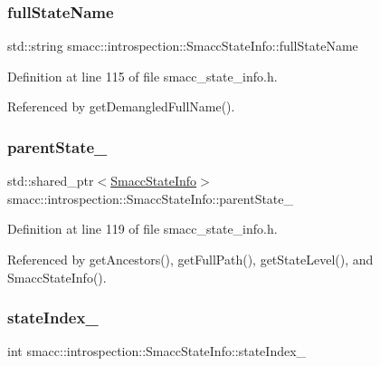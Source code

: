\subsubsection{\texorpdfstring{full\+State\+Name}{fullStateName}}
{\footnotesize\ttfamily std\+::string smacc\+::introspection\+::\+Smacc\+State\+Info\+::full\+State\+Name}



Definition at line 115 of file smacc\+\_\+state\+\_\+info.\+h.



Referenced by get\+Demangled\+Full\+Name().

\mbox{\label{classsmacc_1_1introspection_1_1SmaccStateInfo_afa49a141d2ccdb3d6f9676ed380ce006}} 
\subsubsection{\texorpdfstring{parent\+State\+\_\+}{parentState\_}}
{\footnotesize\ttfamily std\+::shared\+\_\+ptr$<$\hyperlink{classsmacc_1_1introspection_1_1SmaccStateInfo}{Smacc\+State\+Info}$>$ smacc\+::introspection\+::\+Smacc\+State\+Info\+::parent\+State\+\_\+}



Definition at line 119 of file smacc\+\_\+state\+\_\+info.\+h.



Referenced by get\+Ancestors(), get\+Full\+Path(), get\+State\+Level(), and Smacc\+State\+Info().

\mbox{\label{classsmacc_1_1introspection_1_1SmaccStateInfo_a2354fa7abf158f0c29ab71c3125c9801}} 
\subsubsection{\texorpdfstring{state\+Index\+\_\+}{stateIndex\_}}
{\footnotesize\ttfamily int smacc\+::introspection\+::\+Smacc\+State\+Info\+::state\+Index\+\_\+}



